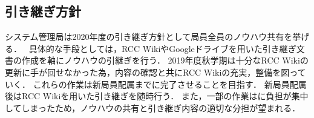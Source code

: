 \subsection*{引き継ぎ方針}

システム管理局は2020年度の引き継ぎ方針として局員全員のノウハウ共有を挙げる．　
具体的な手段としては，RCC WikiやGoogleドライブを用いた引き継ぎ文書の作成を軸にノウハウの引継ぎを行う．
2019年度秋学期は十分なRCC Wikiの更新に手が回せなかった為，内容の確認と共にRCC Wikiの充実，整備を図っていく．
これらの作業は新局員配属までに完了させることを目指す．
新局員配属後はRCC Wikiを用いた引き継ぎを随時行う．
また，一部の作業は\thirdGrade{}に負担が集中してしまったため，ノウハウの共有と引き継ぎ内容の適切な分担が望まれる．